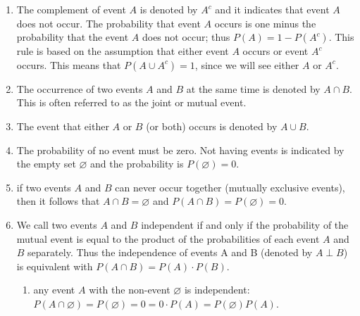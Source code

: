 \begin{enumerate}
    \item The complement of event $A$ is denoted by $A^c$ and it indicates that event $A$ does not occur.
    The probability that event $A$ occurs is one minus the probability that the event $A$ does not occur; thus $P (A) = 1 - P (A^c)$.
    This rule is based on the assumption that either event $A$ occurs or event $A^c$ occurs.
    This means that $P (A \cup A^c) = 1$, since we will see either $A$ or $A^c$.
    \hfill \cite{statistics/book/Statistics-for-Data-Scientists/Maurits-Kaptein}

    \item 
    \begin{definition}
        The occurrence of two events $A$ and $B$ at the same time is denoted by $A \cap B$. 
        This is often referred to as the joint or mutual event. 
        \hfill \cite{statistics/book/Statistics-for-Data-Scientists/Maurits-Kaptein}
    \end{definition}

    \item The event that either $A$ or $B$ (or both) occurs is denoted by $A \cup B$.
    \hfill \cite{statistics/book/Statistics-for-Data-Scientists/Maurits-Kaptein}

    \item The probability of no event must be zero. 
    Not having events is indicated by the empty set $\varnothing$ and the probability is $P(\varnothing) = 0$. 
    \hfill \cite{statistics/book/Statistics-for-Data-Scientists/Maurits-Kaptein}

    
    \item 
    \begin{definition}[mutually exclusive events ($P (A \cap B) = P (\varnothing) = 0$)]
        if two events $A$ and $B$ can never occur together (mutually exclusive events), then it follows that $A \cap B = \varnothing$ and $P (A \cap B) = P (\varnothing) = 0$.
        \hfill \cite{statistics/book/Statistics-for-Data-Scientists/Maurits-Kaptein}
    \end{definition}

    \item 
    \begin{definition}[independent events ($A \perp B$) ($P (A \cap B) = P (A) \cdot P (B)$)]
        We call two events $A$ and $B$ independent if and only if the probability of the mutual event is equal to the product of the probabilities of each event $A$ and $B$ separately.
        Thus the independence of events A and B (denoted by $A \perp B$) is equivalent with $P (A \cap B) = P (A) \cdot P (B)$.
        \hfill \cite{statistics/book/Statistics-for-Data-Scientists/Maurits-Kaptein}
    \end{definition}
    \begin{enumerate}
        \item any event $A$ with the non-event $\varnothing$ is independent: $P(A \cap \varnothing) = P(\varnothing) = 0 = 0 \cdot P(A) = P(\varnothing) P(A)$.
        \hfill \cite{statistics/book/Statistics-for-Data-Scientists/Maurits-Kaptein}


\end{enumerate}
\end{enumerate}
